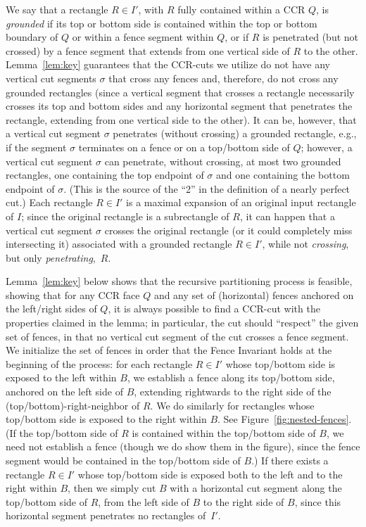 \documentclass{article}
\begin{document}
We say that a rectangle $R\in I'$, with $R$ fully contained within a CCR
$Q$, is {\em grounded} if its top or bottom side is
contained within the top or bottom boundary of $Q$ or within a fence
segment within $Q$, or if $R$ is penetrated (but not crossed) by a fence segment that extends from one vertical side of $R$ to the other.
Lemma~\ref{lem:key} guarantees that the CCR-cuts we utilize do
not have any vertical cut segments $\sigma$ that cross any fences and,
therefore, do not cross any grounded rectangles (since a vertical
segment that crosses a rectangle necessarily crosses its top and
bottom sides and any horizontal segment that penetrates the rectangle, extending from one vertical side to the other). It can be, however, that a vertical cut segment
$\sigma$ penetrates (without crossing) a grounded rectangle, e.g., if
the segment $\sigma$ terminates on a fence or on a top/bottom side of
$Q$; however, a vertical cut segment $\sigma$ can penetrate, without
crossing, at most two grounded rectangles, one containing the top
endpoint of $\sigma$ and one containing the bottom endpoint of $\sigma$. (This is
the source of the ``2'' in the definition of a nearly perfect cut.)
%
Each rectangle $R\in I'$ is a maximal expansion of an original input
rectangle of $I$; since the original rectangle is a subrectangle of
$R$, it can happen that a vertical cut segment $\sigma$ crosses the
original rectangle (or it could completely miss intersecting it)
associated with a grounded rectangle $R\in I'$, while not {\em
  crossing}, but only {\em penetrating},~$R$.

Lemma~\ref{lem:key} below shows that the recursive partitioning
process is feasible, showing that for any CCR face $Q$ and any set of
(horizontal) fences anchored on the left/right sides of $Q$, it is
always possible to find a CCR-cut with the properties claimed in the
lemma; in particular, the cut should ``respect'' the given set of
fences, in that no vertical cut segment of the cut crosses a fence
segment.  We initialize the set of fences in order that the
Fence Invariant holds at the beginning of the process:
%
for each rectangle $R\in I'$ whose top/bottom side is exposed to the left
within $B$, we establish a fence along its top/bottom side, anchored on the
left side of $B$, extending rightwards to the right side of the
(top/bottom)-right-neighbor of $R$. We do similarly
for rectangles whose top/bottom side is exposed to the right within $B$.  See
Figure~\ref{fig:nested-fences}.
(If the top/bottom side of $R$ is contained within the
top/bottom side of $B$, we need not establish a fence (though we do show them in the figure), since the fence
segment would be contained in the top/bottom side of $B$.) If there exists a rectangle $R\in I'$
whose top/bottom side is exposed both to the left and to the right within
$B$, then we simply cut $B$ with a horizontal cut segment along the
top/bottom side of $R$, from the left side of $B$ to the right side of $B$,
since this horizontal segment penetrates no rectangles of~$I'$.
\end{document}
